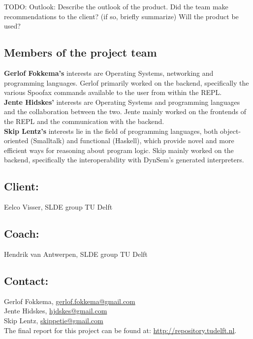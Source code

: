 TODO: Outlook: Describe the outlook of the product. Did the team make recommendations to the 
client? (if so, briefly summarize) Will the product be used?

\subsection*{Members of the project team}
\textbf{Gerlof Fokkema's} interests are Operating Systems, networking and
programming languages. Gerlof primarily worked on the backend, specifically the
various Spoofax commands available to the user from within the REPL.\\
\textbf{Jente Hidskes'} interests are Operating Systems and programming
languages and the collaboration between the two. Jente mainly worked
on the frontends of the REPL and the communication with the backend.\\
\textbf{Skip Lentz's} interests lie in the field of programming languages,
both object-oriented (Smalltalk) and functional (Haskell), which provide
novel and more efficient ways for reasoning about program logic. Skip mainly
worked on the backend, specifically the interoperability with DynSem's
generated interpreters.

\subsection*{Client:}
Eelco Visser, SLDE group TU Delft

\subsection*{Coach:}
Hendrik van Antwerpen, SLDE group TU Delft

\subsection*{Contact:}
Gerlof Fokkema, \href{mailto:gerlof.fokkema@gmail.com}{gerlof.fokkema@gmail.com}\\
Jente Hidskes, \href{mailto:hjdskes@gmail.com}{hjdskes@gmail.com}\\
Skip Lentz, \href{mailto:skippetie@gmail.com}{skippetie@gmail.com}\\

\noindent The final report for this project can be found at: \url{http://repository.tudelft.nl}.

